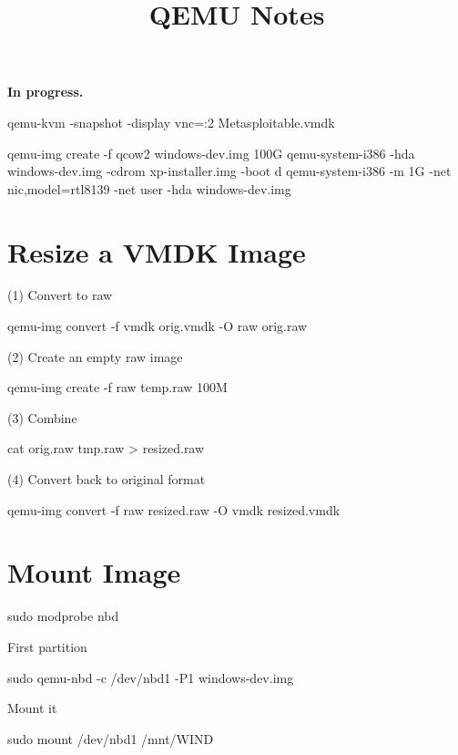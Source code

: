 
\title{QEMU Notes}
\date{}



\tableofcontents

\textbf{In progress.}

\begin{code}
qemu-kvm -snapshot -display vnc=:2 Metasploitable.vmdk
\end{code}

\begin{code}
qemu-img create -f qcow2 windows-dev.img 100G
qemu-system-i386 -hda windows-dev.img -cdrom xp-installer.img -boot d
qemu-system-i386 -m 1G -net nic,model=rtl8139 -net user -hda windows-dev.img
\end{code}

\section{Resize a VMDK Image}
(1) Convert to raw
\begin{code}
qemu-img convert -f vmdk orig.vmdk -O raw orig.raw
\end{code}
(2) Create an empty raw image
\begin{code}
qemu-img create -f raw temp.raw 100M
\end{code}
(3) Combine
\begin{code}
cat orig.raw tmp.raw > resized.raw
\end{code}
(4) Convert back to original format
\begin{code}
qemu-img convert -f raw resized.raw -O vmdk resized.vmdk
\end{code}

\section{Mount Image}
\begin{code}
sudo modprobe nbd
\end{code}
First partition
\begin{code}
sudo qemu-nbd -c /dev/nbd1 -P1 windows-dev.img
\end{code}
Mount it
\begin{code}
sudo mount /dev/nbd1 /mnt/WIND
\end{code}


